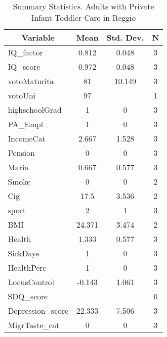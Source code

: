 
\begin{table}[htbp]\centering \caption{Summary Statistics. Adults with Private Infant-Toddler Care in Reggio \label{bothAdultasiloPrivReggio}}
\begin{tabular}{l c c  c}\hline\hline
\multicolumn{1}{c}{\textbf{Variable}} & \textbf{Mean}
 & \textbf{Std. Dev.} & \textbf{N}\\ \hline
IQ\_factor & 0.812 & 0.048  & 3\\
IQ\_score & 0.972 & 0.048  & 3\\
votoMaturita & 81 & 10.149  & 3\\
votoUni & 97 &   & 1\\
highschoolGrad & 1 & 0  & 3\\
PA\_Empl & 1 & 0  & 3\\
IncomeCat & 2.667 & 1.528  & 3\\
Pension & 0 & 0  & 3\\
Maria & 0.667 & 0.577  & 3\\
Smoke & 0 & 0  & 2\\
Cig & 17.5 & 3.536  & 2\\
sport & 2 & 1  & 3\\
BMI & 24.371 & 3.474  & 2\\
Health & 1.333 & 0.577  & 3\\
SickDays & 1 & 0  & 3\\
HealthPerc & 1 & 0  & 3\\
LocusControl & -0.143 & 1.061  & 3\\
SDQ\_score &  &   & 0\\
Depression\_score & 22.333 & 7.506  & 3\\
MigrTaste\_cat & 0 & 0  & 3\\
\hline\end{tabular}
\end{table}
